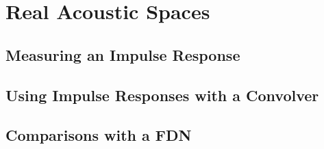 \chapter{Real Acoustic Spaces}
\section{Measuring an Impulse Response}
\section{Using Impulse Responses with a Convolver}
\section{Comparisons with a FDN}
